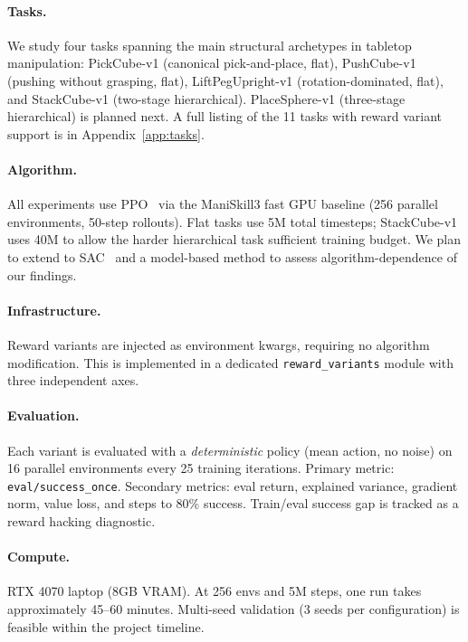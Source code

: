 \documentclass{article}
\begin{document}
\paragraph{Tasks.}
We study four tasks spanning the main structural archetypes in tabletop manipulation:
PickCube-v1 (canonical pick-and-place, flat),
PushCube-v1 (pushing without grasping, flat),
LiftPegUpright-v1 (rotation-dominated, flat),
and StackCube-v1 (two-stage hierarchical).
PlaceSphere-v1 (three-stage hierarchical) is planned next.
A full listing of the 11 tasks with reward variant support is in
Appendix~\ref{app:tasks}.

\paragraph{Algorithm.}
All experiments use PPO~\citep{schulman2017ppo} via the ManiSkill3 fast GPU baseline
(256 parallel environments, 50-step rollouts).
Flat tasks use 5M total timesteps; StackCube-v1 uses 40M to allow the harder
hierarchical task sufficient training budget.
We plan to extend to SAC~\citep{haarnoja2018sac} and a model-based method
to assess algorithm-dependence of our findings.

\paragraph{Infrastructure.}
Reward variants are injected as environment kwargs, requiring no algorithm modification.
This is implemented in a dedicated \texttt{reward\_variants} module with three
independent axes.

\paragraph{Evaluation.}
Each variant is evaluated with a \emph{deterministic} policy (mean action, no noise)
on 16 parallel environments every 25 training iterations.
Primary metric: \texttt{eval/success\_once}. Secondary metrics: eval return,
explained variance, gradient norm, value loss, and steps to 80\% success.
Train/eval success gap is tracked as a reward hacking diagnostic.

\paragraph{Compute.}
RTX 4070 laptop (8GB VRAM). At 256 envs and 5M steps, one run takes approximately
45--60 minutes. Multi-seed validation (3 seeds per configuration) is feasible within
the project timeline.
\end{document}
